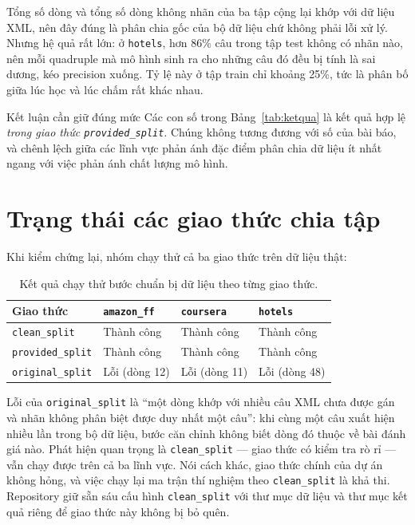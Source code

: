 \documentclass[12pt,a4paper]{report}
\newcommand{\enquote}[1]{“#1”}
\newcommand{\code}[1]{\texttt{#1}}
\begin{document}
Tổng số dòng và tổng số dòng không nhãn của ba tập cộng lại khớp với dữ liệu XML, nên đây đúng là phân chia gốc của bộ
dữ liệu chứ không phải lỗi xử lý. Nhưng hệ quả rất lớn: ở \code{hotels}, hơn 86\% câu trong tập test không có nhãn nào,
nên mỗi quadruple mà mô hình sinh ra cho những câu đó đều bị tính là sai dương, kéo precision xuống. Tỷ lệ này ở tập
train chỉ khoảng 25\%, tức là phân bố giữa lúc học và lúc chấm rất khác nhau.

\begin{ghichu}{Kết luận cần giữ đúng mức}
Các con số trong Bảng~\ref{tab:ketqua} là kết quả hợp lệ \emph{trong giao thức \code{provided\_split}}. Chúng không
tương đương với số của bài báo, và chênh lệch giữa các lĩnh vực phản ánh đặc điểm phân chia dữ liệu ít nhất ngang với
việc phản ánh chất lượng mô hình.
\end{ghichu}

\section{Trạng thái các giao thức chia tập}

Khi kiểm chứng lại, nhóm chạy thử cả ba giao thức trên dữ liệu thật:

\begin{table}[H]
\centering
\caption{Kết quả chạy thử bước chuẩn bị dữ liệu theo từng giao thức.}
\begin{tabular}{llll}
\toprule
\textbf{Giao thức} & \code{amazon\_ff} & \code{coursera} & \code{hotels} \\
\midrule
\code{clean\_split}    & Thành công & Thành công & Thành công \\
\code{provided\_split} & Thành công & Thành công & Thành công \\
\code{original\_split} & Lỗi (dòng 12) & Lỗi (dòng 11) & Lỗi (dòng 48) \\
\bottomrule
\end{tabular}
\end{table}

Lỗi của \code{original\_split} là \enquote{một dòng khớp với nhiều câu XML chưa được gán và nhãn không phân biệt được
duy nhất một câu}: khi cùng một câu xuất hiện nhiều lần trong bộ dữ liệu, bước căn chỉnh không biết dòng đó thuộc về
bài đánh giá nào. Phát hiện quan trọng là \code{clean\_split} --- giao thức có kiểm tra rò rỉ --- vẫn chạy được trên cả
ba lĩnh vực. Nói cách khác, giao thức chính của dự án không hỏng, và việc chạy lại ma trận thí nghiệm theo
\code{clean\_split} là khả thi. Repository giữ sẵn sáu cấu hình \code{clean\_split} với thư mục dữ liệu và thư mục kết
quả riêng để giao thức này không bị bỏ quên.
\end{document}

